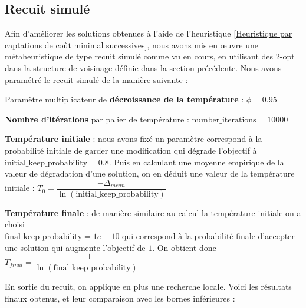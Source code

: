 \documentclass[12pt]{article}
\begin{document}
\subsection{Recuit simulé}

Afin d'améliorer les solutions obtenues à l'aide de l'heuristique \ref{Heuristique par captations de coût minimal successives}, nous avons mis en \oe uvre une métaheuristique de type recuit simulé comme vu en cours, en utilisant des 2-opt dans la structure de voisinage définie dans la section précédente. Nous avons paramétré le recuit simulé de la manière suivante :

\begin{bulletlist}
  \item Paramètre multiplicateur de \textbf{décroissance de la température} : $\phi=0.95$
  \item \textbf{Nombre d'itérations} par palier de température : $\text{number\_iterations} = 10000$
  \item \textbf{Température initiale} : nous avons fixé un paramètre correspond à la probabilité initiale de garder une modification qui dégrade l'objectif à $\text{initial\_keep\_probability} = 0.8$. Puis en calculant une moyenne empirique de la valeur de dégradation d'une solution, on en déduit une valeur de la température initiale : $T_0 = \dfrac{- \Delta_{mean}}{\ln(\text{initial\_keep\_probability})}$
  \item \textbf{Température finale} : de manière similaire au calcul la température initiale on a choisi\\ $\text{final\_keep\_probability} = 1e-10$ qui correspond à la probabilité finale d'accepter une solution qui augmente l'objectif de $1$. On obtient donc $T_{final} = \dfrac{- 1}{\ln(\text{final\_keep\_probability})}$
\end{bulletlist}

En sortie du recuit, on applique en plus une recherche locale. Voici les résultats finaux obtenus, et leur comparaison avec les bornes inférieures :
\end{document}
